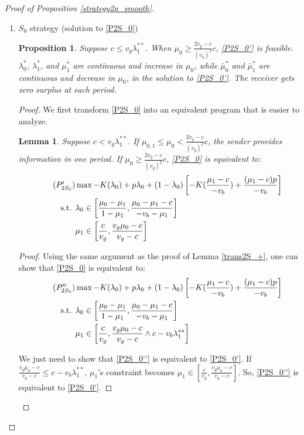 \documentclass[11pt]{extarticle}
\newtheorem{proposition}{Proposition}
\newtheorem{lemma}{Lemma}
\newcommand{\m}{\wedge}
\begin{document}
\begin{proof}[Proof of Proposition \ref{strategy2p_smooth}]
\begin{enumerate}
		\item $S_0$ strategy (solution to \eqref{P2S_0})
		
		\begin{proposition}\label{strategy2S_0}
			Suppose $c \leq v_g\lambda_1^{**}$. When $\mu_0 \geq \frac{2v_g-c}{(v_g)^2}c$, \eqref{P2S_0'} is feasible. $\lambda_0^*$, $\lambda_1^*$, and $\mu_1^*$ are continuous and increase in $\mu_0$, while $\bar{\mu}_0^*$ and $\bar{\mu}_1^*$ are continuous and decrease in $\mu_0$, in the solution to \eqref{P2S_0'}. The receiver gets zero surplus at each period. 
		\end{proposition}
		\begin{proof}
			We first transform \eqref{P2S_0} into an equivalent program that is easier to analyze.
			\begin{lemma}\label{trans2S_0}
				Suppose $c < v_g\lambda_1^{**}$. If $\mu_{0,1} \leq \mu_0 < \frac{2v_g-c}{(v_g)^2}c$, the sender provides information in one period. If $\mu_0 \geq \frac{2v_g-c}{(v_g)^2}c$, \eqref{P2S_0} is equivalent to:	
				\begin{align}\tag{$P'_{2S_0}$} \label{P2S_0'}
				& \max -K(\lambda_0) + p \lambda_0 + (1-\lambda_0) \left[-K(\frac{\mu_1-c}{-v_b})+\frac{(\mu_1-c)p}{-v_b}\right] \nonumber\\
				\text{s.t. } &\lambda_0 \in \left[\frac{\mu_0-\mu_1}{1-\mu_1}, \frac{\mu_0-\mu_1-c}{-v_b-\mu_1}\right] \nonumber\\
				&\mu_1\in \left[\frac{c}{v_g}, \frac{v_g\mu_0-c}{v_g-c} \right] \nonumber
				\end{align}
			\end{lemma}
			\begin{proof}
				Using the same argument as the proof of Lemma \ref{trans2S_+}, one can show that \eqref{P2S_0} is equivalent to:
				\vspace{-10pt}
				\begin{align}\tag{$P''_{2S_0}$} \label{P2S_0''}
				& \max -K(\lambda_0) + p \lambda_0 + (1-\lambda_0) \left[-K(\frac{\mu_1-c}{-v_b})+\frac{(\mu_1-c)p}{-v_b}\right] \nonumber\\
				\text{s.t. } &\lambda_0 \in \left[\frac{\mu_0-\mu_1}{1-\mu_1}, \frac{\mu_0-\mu_1-c}{-v_b-\mu_1}\right] \nonumber\\
				&\mu_1\in \left[\frac{c}{v_g}, \frac{v_g\mu_0-c}{v_g-c}\m c-v_b\lambda_1^{**} \right] \nonumber
				\end{align}
				
				We just need to show that \eqref{P2S_0''} is equivalent to \eqref{P2S_0'}. If $\frac{v_g\mu_0-c}{v_g-c} \leq c-v_b\lambda_1^{**}$, $\mu_1$'s constraint becomes $\mu_1\in \left[\frac{c}{v_g}, \frac{v_g\mu_0-c}{v_g-c} \right]$. So, \eqref{P2S_0''} is equivalent to \eqref{P2S_0'}. 
				

\end{proof}
\end{proof}
\end{enumerate}
\end{proof}
\end{document}
